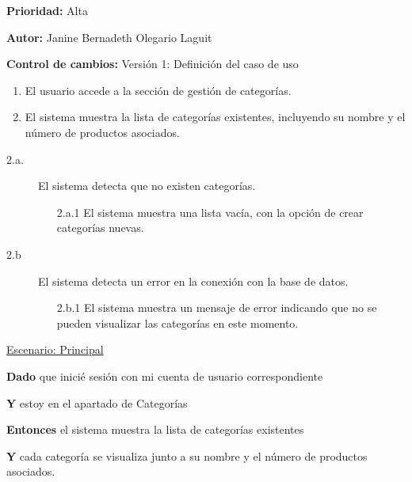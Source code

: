 \textbf{Prioridad: }
Alta
\vspace{0.15cm}

\textbf{Autor: }
Janine Bernadeth Olegario Laguit\par
\vspace{0.15cm}

\textbf{Control de cambios: } Versión 1: Definición del caso de uso

\begin{enumerate}
    \item El usuario accede a la sección de gestión de categorías.
    \item El sistema muestra la lista de categorías existentes, incluyendo su nombre y el número de productos asociados.
\end{enumerate}

\begin{description}
    \item[2.a.] El sistema detecta que no existen categorías.
    \begin{enumerate}
        \item[2.a.1] El sistema muestra una lista vacía, con la opción de crear categorías nuevas.
    \end{enumerate}

    \item[2.b] El sistema detecta un error en la conexión con la base de datos.
    \begin{enumerate}
        \item[2.b.1] El sistema muestra un mensaje de error indicando que no se pueden visualizar las categorías en este momento.
    \end{enumerate}
\end{description}

\underline{Escenario: Principal}\par
\vspace{0.15cm}

\textbf{Dado} que inicié sesión con mi cuenta de usuario correspondiente\par
\textbf{Y} estoy en el apartado de Categorías\par
\textbf{Entonces} el sistema muestra la lista de categorías existentes\par
\textbf{Y} cada categoría se visualiza junto a su nombre y el número de productos asociados.\par


